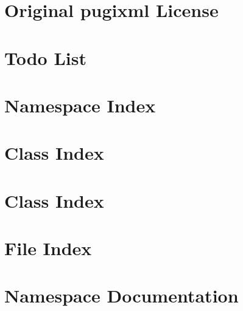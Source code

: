 \documentclass[a4paper]{article}
\begin{document}
\section{Original pugixml License}
\label{OriginalpugixmlLicense}
\hypertarget{OriginalpugixmlLicense}{}

\section{Todo List}
\label{todo}
\hypertarget{todo}{}

\section{Namespace Index}

\section{Class Index}

\section{Class Index}

\section{File Index}

\section{Namespace Documentation}









\end{document}
